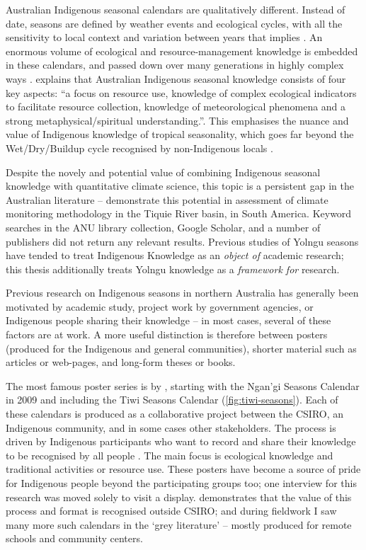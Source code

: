 Australian Indigenous seasonal calendars are qualitatively different.
Instead of date, seasons are defined by weather events and ecological cycles,
with all the sensitivity to local context and variation between years that
implies \citep[eg.][]{davis1989}.  An enormous volume of ecological and
resource-management knowledge is embedded in these calendars, and passed
down over many generations in highly complex ways \citep{barber2005}.
%
\citet{woodward2012b} explains that Australian Indigenous seasonal knowledge
consists of four key aspects: ``a focus on resource use, knowledge of complex
ecological indicators to facilitate resource collection, knowledge of
meteorological phenomena and a strong metaphysical/spiritual understanding.''.
This emphasises the nuance and value of Indigenous knowledge of tropical
seasonality, which goes far beyond the Wet/Dry/Buildup cycle recognised
by non-Indigenous locals \citep{kingsley2003}.


Despite the novely and potential value of combining Indigenous seasonal
knowledge with quantitative climate science, this topic is a persistent gap
in the Australian literature -- \citet{cochran2015} demonstrate this potential
in assessment of climate monitoring methodology in the Tiquie River basin,
in South America.  Keyword searches in the ANU library collection, Google
Scholar, and a number of publishers did not return any relevant results.
Previous studies of Yolngu seasons have tended to treat Indigenous Knowledge
as an \emph{object of} academic research; this thesis additionally treats
Yolngu knowledge as a \emph{framework for} research.


Previous research on Indigenous seasons in northern Australia has generally
been motivated by academic study, project work by government agencies, or
Indigenous people sharing their knowledge -- in most cases, several of these
factors are at work.  A more useful distinction is therefore between posters
(produced for the Indigenous and general communities), shorter material such
as articles or web-pages, and long-form theses or books.

The most famous poster series is by \citet{CSIROcals}, starting with the
Ngan'gi Seasons Calendar in 2009 and including the Tiwi Seasons Calendar
(\cref{fig:tiwi-seasons}).  Each of these calendars is produced as a
collaborative project between the CSIRO, an Indigenous community, and in some
cases other stakeholders.  The process is driven by Indigenous participants
who want to record and share their knowledge to be recognised by all people
\citep{woodward2010,oconnor2010}.  The main focus is ecological knowledge and
traditional activities or resource use.  These posters have become a source of
pride for Indigenous people beyond the participating groups too; one interview
for this research was moved solely to visit a display.  \citet{gotha2012}
demonstrates that the value of this process and format is recognised outside
CSIRO; and during fieldwork I saw many more such calendars in the `grey
literature' -- mostly produced for remote schools and community centers.


